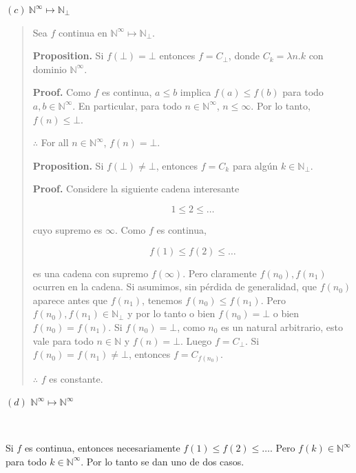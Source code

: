 \documentclass[a4paper, 12pt]{article}
\begin{document}
\pagebreak

$(c) ~ \mathbb{N}^\infty \mapsto \mathbb{N}_\bot $


\small
\begin{quote}

Sea $f$ continua en $\mathbb{N}^\infty \mapsto \mathbb{N}_\bot$.

\textbf{Proposition.} Si $f(\bot ) = \bot $ entonces $f = C_\bot $, donde $C_k
=\lambda n . k$ con dominio $\mathbb{N}^\infty$.

\textbf{Proof.} Como $f$ es continua, $a \leq b$ implica $f(a) \leq f(b)$ para
todo $a, b \in \mathbb{N}^\infty$. En particular, para todo $n \in
\mathbb{N}^\infty$, $n \leq \infty$. Por lo tanto, $f(n) \leq \bot$. 

$\therefore $ For all $n \in \mathbb{N}^\infty$, $f(n) = \bot $.

\textbf{Proposition.} Si $f(\bot) \neq \bot$, entonces $f = C_k$ para algún $k
\in \mathbb{N}_\bot$.

\textbf{Proof.} Considere la siguiente cadena interesante

\begin{equation*}
  1 \leq 2 \leq \ldots
\end{equation*}

cuyo supremo es $\infty$. Como $f$ es continua, 

\begin{equation*}
  f(1) \leq f(2) \leq \ldots
\end{equation*}

es una cadena con supremo $f(\infty )$. Pero claramente $f(n_0), f(n_1)$ ocurren
en la cadena. Si asumimos, sin pérdida de generalidad, que $f(n_0)$ aparece
antes que $f(n_1)$, tenemos $f(n_0) \leq f(n_1)$. Pero $f(n_0), f(n_1) \in
\mathbb{N}_\bot $ y por lo tanto o bien $f(n_0) = \bot $ o bien $f(n_0) =
f(n_1)$. Si $f(n_0) = \bot$, como $n_0$ es un natural arbitrario, esto vale para
todo $n \in \mathbb{N}$ y $f(n) = \bot $. Luego $f = C_\bot $. Si $f(n_0) =
f(n_1) \neq \bot $, entonces $f = C_{f(n_0)}$.

$\therefore $ $f$ es constante.


\end{quote}
\normalsize



\pagebreak 

$(d)$ $\mathbb{N}^\infty \mapsto \mathbb{N}^\infty$

~

Si $f$ es continua, entonces necesariamente $f(1) \leq f(2) \leq \ldots$. Pero
$f(k) \in \mathbb{N}^\infty$ para todo $k \in \mathbb{N}^\infty$. Por lo tanto
se dan uno de dos casos.
\end{document}
